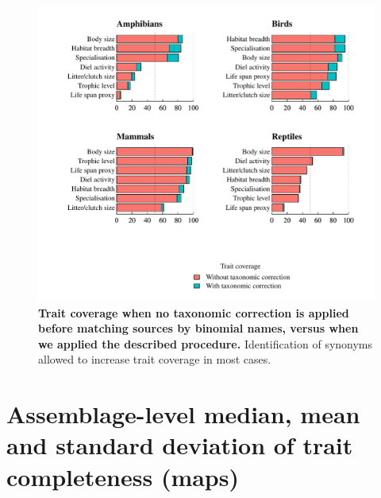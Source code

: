 \begin{figure}[h!]
\centering
\includegraphics[scale=0.7]{Supporting/Chapter2/Figures/Coverage/DeltaCoverage}
\caption[Trait coverage when no taxonomic correction is applied before matching sources by binomial names, versus when we applied the described procedure]{\textbf{Trait coverage when no taxonomic correction is applied before matching sources by binomial names, versus when we applied the described procedure.} Identification of synonyms allowed to increase trait coverage in most cases.}
\label{SI_2_deltaCov_taxcor}
\end{figure}

\newpage
\pagebreak

\section{Assemblage-level median, mean and standard deviation of trait completeness (maps)}

